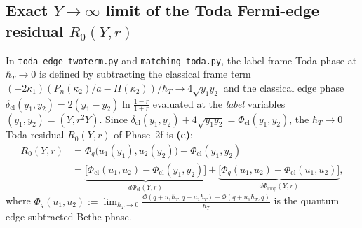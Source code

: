\documentclass[11pt,a4paper]{article}
\newcommand{\hb}{\hbar}
\begin{document}
\subsection{Exact $Y\to\infty$ limit of the Toda Fermi-edge residual $R_0(Y,r)$}

In \texttt{toda\_edge\_twoterm.py} and \texttt{matching\_toda.py}, the label-frame
Toda phase at $\hb_T\to 0$ is defined by subtracting the classical frame term
$(-2\kappa_1)(P_n(\kappa_2)/a - \Pi(\kappa_2))/\hb_T \to 4\sqrt{y_1 y_2}$ and the
classical edge phase $\delta_{\mathrm{cl}}(y_1,y_2) = 2(y_1-y_2)\ln\frac{1-r}{1+r}$
evaluated at the \emph{label} variables $(y_1,y_2) = (Y,r^2 Y)$. Since
$\delta_{\mathrm{cl}}(y_1,y_2) + 4\sqrt{y_1 y_2} = \Phi_{\mathrm{cl}}(y_1,y_2)$,
the $\hb_T\to 0$ Toda residual $R_0(Y,r)$ of Phase~2f is \textbf{(c)}:
\begin{align}
  R_0(Y,r)
  &= \Phi_q\big(u_1(y_1),u_2(y_2)\big) - \Phi_{\mathrm{cl}}(y_1,y_2)
  \nonumber \\
  &= \underbrace{\Big[\Phi_{\mathrm{cl}}(u_1,u_2) - \Phi_{\mathrm{cl}}(y_1,y_2)\Big]}_{d\Phi_{\mathrm{cl}}(Y,r)}
     + \underbrace{\Big[\Phi_q(u_1,u_2) - \Phi_{\mathrm{cl}}(u_1,u_2)\Big]}_{d\Phi_{\mathrm{loop}}(Y,r)},
  \label{eq:R0_split}
\end{align}
where $\Phi_q(u_1,u_2) := \lim_{\hb_T\to 0}\frac{\Phi(q+u_1\hb_T,q+u_2\hb_T)-\Phi(q+u_1\hb_T,q)}{\hb_T}$
is the quantum edge-subtracted Bethe phase.
\end{document}
